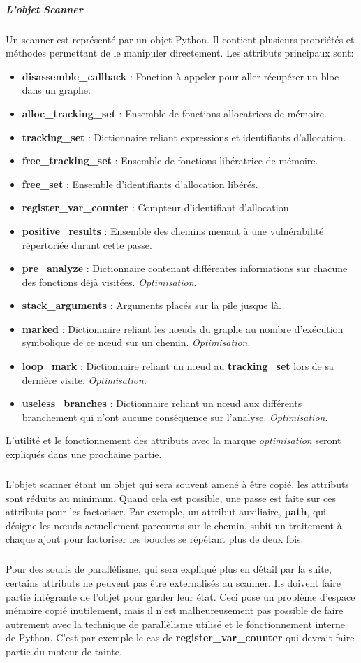 \subparagraph{L'objet Scanner}
Un scanner est représenté par un objet Python. Il contient plusieurs propriétés et méthodes permettant de le manipuler directement.
Les attributs principaux sont:
\begin{itemize}
    \item \textbf{disassemble\_callback} : Fonction à appeler pour aller récupérer un bloc dans un graphe.
    \item \textbf{alloc\_tracking\_set} : Ensemble de fonctions allocatrices de mémoire.
    \item \textbf{tracking\_set} : Dictionnaire reliant expressions et identifiants d'allocation.
    \item \textbf{free\_tracking\_set} : Ensemble de fonctions libératrice de mémoire.
    \item \textbf{free\_set} : Ensemble d'identifiants d'allocation libérés.
    \item \textbf{register\_var\_counter} : Compteur d'identifiant d'allocation
    \item \textbf{positive\_results} : Ensemble des chemins menant à une vulnérabilité répertoriée durant cette passe.
    \item \textbf{pre\_analyze} : Dictionnaire contenant différentes informations sur chacune des fonctions déjà visitées. \textit{Optimisation}.
    \item \textbf{stack\_arguments} : Arguments placés sur la pile jusque là.
    \item \textbf{marked} : Dictionnaire reliant les nœuds du graphe au nombre d'exécution symbolique de ce nœud sur un chemin. \textit{Optimisation}.
    \item \textbf{loop\_mark} : Dictionnaire reliant un nœud au \textbf{tracking\_set} lors de sa dernière visite. \textit{Optimisation}.
    \item \textbf{useless\_branches} : Dictionnaire reliant un nœud aux différents branchement qui n'ont aucune conséquence sur l'analyse. \textit{Optimisation}.
\end{itemize}
L'utilité et le fonctionnement des attributs avec la marque \textit{optimisation} seront expliqués dans une prochaine partie.
\subparagraph{}
L'objet scanner étant un objet qui sera souvent amené à être copié, les attributs sont réduits au minimum. Quand cela est possible, une passe est faite sur
ces attributs pour les factoriser. Par exemple, un attribut auxiliaire, \textbf{path}, qui désigne les nœuds actuellement parcourus sur le chemin, subit un traitement
à chaque ajout pour factoriser les boucles se répétant plus de deux fois.
\subparagraph{}
Pour des soucis de parallélisme, qui sera expliqué plus en détail par la suite, certains attributs ne peuvent pas être externalisés au scanner. Ils doivent faire partie
intégrante de l'objet pour garder leur état. Ceci pose un problème d'espace mémoire copié inutilement, mais il n'est malheureusement pas possible de faire autrement avec
la technique de parallèlisme utilisé et le fonctionnement interne de Python. C'est par exemple le cas de \textbf{register\_var\_counter} qui devrait faire partie du moteur de tainte.

